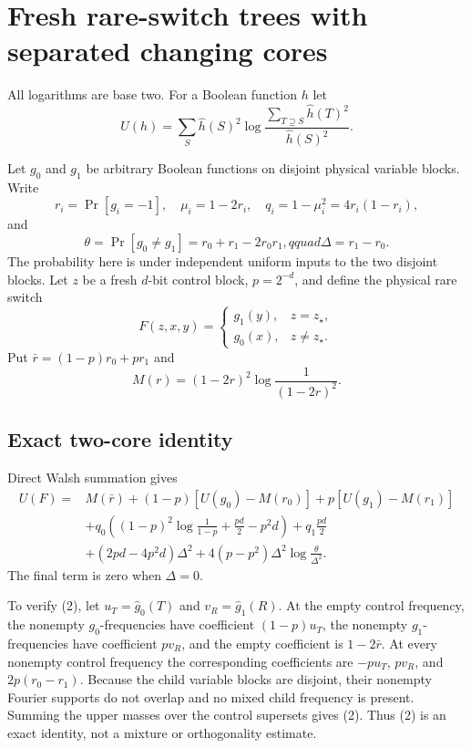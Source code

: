 \section*{Fresh rare-switch trees with separated changing cores}

All logarithms are base two.  For a Boolean function $h$ let
\[
 U(h)=\sum_S\widehat h(S)^2
 \log\frac{\sum_{T\supseteq S}\widehat h(T)^2}{\widehat h(S)^2}.
\]

Let $g_0$ and $g_1$ be arbitrary Boolean functions on disjoint physical
variable blocks.  Write
\[
 r_i=\Pr[g_i=-1],\quad \mu_i=1-2r_i,\quad
 q_i=1-\mu_i^2=4r_i(1-r_i),
\]
and
\[
 \theta=\Pr[g_0\ne g_1]=r_0+r_1-2r_0r_1,qquad
 \Delta=r_1-r_0.
\]
The probability here is under independent uniform inputs to the two
disjoint blocks.  Let $z$ be a fresh $d$-bit control block, $p=2^{-d}$,
and define the physical rare switch
\[
 F(z,x,y)=\begin{cases}
 g_1(y),&z=z_\star,\\
 g_0(x),&z\ne z_\star.
 \end{cases}                                                   \tag{1}
\]
Put $\bar r=(1-p)r_0+pr_1$ and
\[
 M(r)=(1-2r)^2\log\frac1{(1-2r)^2}.
\]

\subsection*{Exact two-core identity}

Direct Walsh summation gives
\begin{align}
U(F)={}&M(\bar r)+(1-p)[U(g_0)-M(r_0)]+p[U(g_1)-M(r_1)]\\
&+q_0\left((1-p)^2\log\frac1{1-p}+\frac{pd}{2}-p^2d\right)
 +q_1\frac{pd}{2}\\
&+(2pd-4p^2d)\Delta^2
 +4(p-p^2)\Delta^2\log\frac{\theta}{\Delta^2}.              \tag{2}
\end{align}
The final term is zero when $\Delta=0$.

To verify (2), let $u_T=\widehat g_0(T)$ and
$v_R=\widehat g_1(R)$.  At the empty control frequency, the nonempty
$g_0$-frequencies have coefficient $(1-p)u_T$, the nonempty
$g_1$-frequencies have coefficient $pv_R$, and the empty coefficient is
$1-2\bar r$.  At every nonempty control frequency the corresponding
coefficients are $-pu_T$, $pv_R$, and $2p(r_0-r_1)$.  Because the child
variable blocks are disjoint, their nonempty Fourier supports do not
overlap and no mixed child frequency is present.  Summing the upper masses
over the control supersets gives (2).  Thus (2) is an exact identity, not a
mixture or orthogonality estimate.

